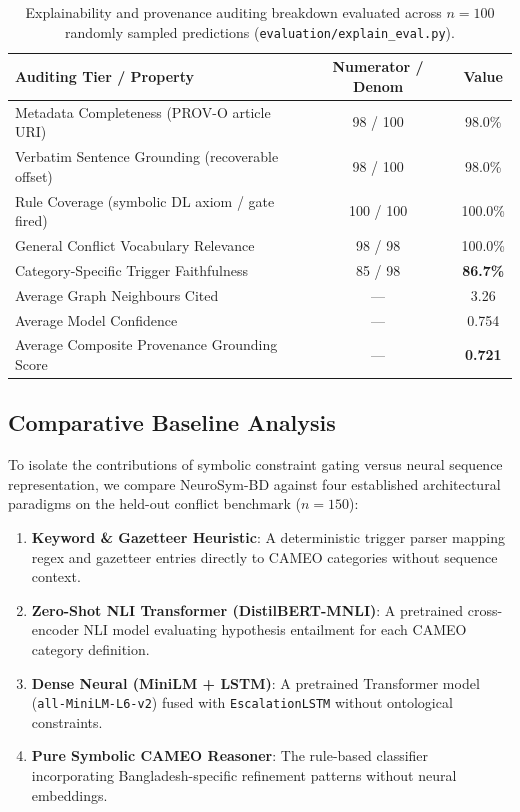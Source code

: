 \documentclass[11pt,a4paper]{article}
\begin{document}
\begin{table}[h]
\centering
\caption{Explainability and provenance auditing breakdown evaluated across $n=100$ randomly sampled predictions (\texttt{evaluation/explain\_eval.py}).}
\label{tab:explain}
\begin{tabular}{lcc}
\toprule
\textbf{Auditing Tier / Property} & \textbf{Numerator / Denom} & \textbf{Value} \\
\midrule
Metadata Completeness (PROV-O article URI)         & 98 / 100 & 98.0\% \\
Verbatim Sentence Grounding (recoverable offset)   & 98 / 100 & 98.0\% \\
Rule Coverage (symbolic DL axiom / gate fired)     & 100 / 100 & 100.0\% \\
General Conflict Vocabulary Relevance              & 98 / 98  & 100.0\% \\
Category-Specific Trigger Faithfulness             & 85 / 98  & \textbf{86.7\%} \\
Average Graph Neighbours Cited                     & ---      & 3.26   \\
Average Model Confidence                           & ---      & 0.754  \\
Average Composite Provenance Grounding Score       & ---      & \textbf{0.721}  \\
\bottomrule
\end{tabular}
\end{table}

\subsection{Comparative Baseline Analysis}
\label{sec:baselines}

To isolate the contributions of symbolic constraint gating versus neural sequence representation,
we compare NeuroSym-BD against four established architectural paradigms on the held-out conflict benchmark ($n=150$):
\begin{enumerate}
  \item \textbf{Keyword \& Gazetteer Heuristic}: A deterministic trigger parser mapping regex and gazetteer entries directly to CAMEO categories without sequence context.
  \item \textbf{Zero-Shot NLI Transformer (DistilBERT-MNLI)}: A pretrained cross-encoder NLI model evaluating hypothesis entailment for each CAMEO category definition.
  \item \textbf{Dense Neural (MiniLM + LSTM)}: A pretrained Transformer model (\texttt{all-MiniLM-L6-v2}) fused with \texttt{EscalationLSTM} without ontological constraints.
  \item \textbf{Pure Symbolic CAMEO Reasoner}: The rule-based classifier incorporating Bangladesh-specific refinement patterns without neural embeddings.
\end{enumerate}
\end{document}
